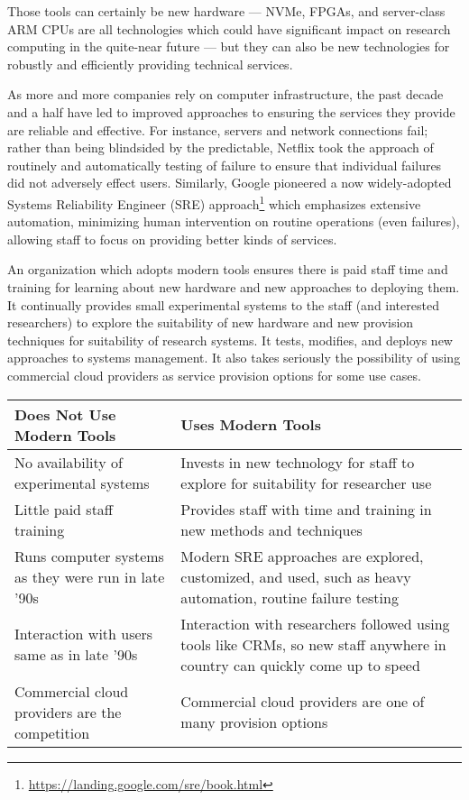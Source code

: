 \documentclass[11pt]{article}
\begin{document}
Those tools can certainly be new hardware --- NVMe, FPGAs, and
server-class ARM CPUs are all technologies which could have significant
impact on research computing in the quite-near future --- but they
can also be new technologies for robustly and efficiently providing
technical services.

As more and more companies rely on computer infrastructure, the
past decade and a half have led to improved approaches to ensuring
the services they provide are reliable and effective.  For instance,
servers and network connections fail; rather than being blindsided
by the predictable, Netflix took the approach of routinely and
automatically testing of failure to ensure that individual failures
did not adversely effect users.  Similarly, Google pioneered a now
widely-adopted Systems Reliability Engineer (SRE)
approach\footnote{\url{https://landing.google.com/sre/book.html}}
which emphasizes extensive automation, minimizing human intervention
on routine operations (even failures), allowing staff to focus on
providing better kinds of services.

An organization which adopts modern tools ensures there is paid
staff time and training for learning about new hardware and new
approaches to deploying them.  It continually provides small
experimental systems to the staff (and interested researchers) to
explore the suitability of new hardware and new provision techniques
for suitability of research systems.  It tests, modifies, and deploys
new approaches to systems management.
It also takes seriously the possibility of using commercial
cloud providers as service provision options for some use cases.

\begin{table}[ht]
\centering
\small {\sffamily
{}
\begin{tabular}{p{2.5in}|p{2.5in}}
\textcolor{cdaRed}{\textbf{Does Not Use Modern Tools}} & \textcolor{cdaRed}{\textbf{Uses Modern Tools}} \\
\hline
\hline
No availability of experimental systems & Invests in new technology for staff to explore for suitability for researcher use \\
Little paid staff training & Provides staff with time and training in new methods and techniques \\
Runs computer systems as they were run in late '90s & Modern SRE approaches are explored, customized, and used, such as heavy automation, routine failure testing \\
Interaction with users same as in late '90s & Interaction with researchers followed using tools like CRMs, so new staff anywhere in country can quickly come up to speed\\
Commercial cloud providers are the competition & Commercial cloud providers are one of many provision options \\
\hline
\end{tabular}
}
\end{table}
\end{document}
